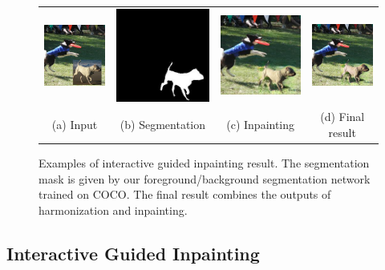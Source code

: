 \begin{figure}[!ht]
\begin{tabular}{cccc}
\includegraphics[width=.25\textwidth]{figures/gi/images/000000355905_input.jpg}&
\includegraphics[width=.25\textwidth]{figures/gi/images/000000355905_mask.jpg}&
\includegraphics[width=.25\textwidth]{figures/gi/images/000000355905_inpainting.jpg}&
\includegraphics[width=.25\textwidth]{figures/gi/images/000000355905_inpainting_harmonization.jpg}\\ 
  (a) Input & (b) Segmentation  & (c) Inpainting & (d) Final result  \\
\end{tabular}
\caption{Examples of interactive guided inpainting result. The segmentation mask is given by our foreground/background segmentation network trained on COCO. The final result combines the outputs of harmonization and inpainting.}
\label{fig:guided}
\end{figure}


\subsection{Interactive Guided Inpainting}
\label{exp:guided} 

